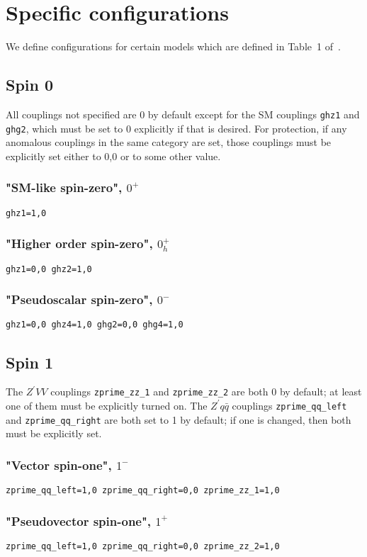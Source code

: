 \documentclass[aps,superscriptaddress,nofootinbib]{revtex4}
\begin{document}
\section{Specific configurations}
We define configurations for certain models which are defined in Table~1 of~\cite{Bolognesi:2012}.
\subsection{Spin 0}
All couplings not specified are 0 by default except for the SM couplings \verb|ghz1| and \verb|ghg2|, which must be set to 0 explicitly if that is desired.  For protection, if any anomalous couplings in the same category are set, those couplings must be explicitly set either to 0,0 or to some other value.
\subsubsection{"SM-like spin-zero", \texorpdfstring{$0^+$}{0+}}
\verb|ghz1=1,0|
\subsubsection{"Higher order spin-zero", \texorpdfstring{$0_h^+$}{0h+}}
\verb|ghz1=0,0 ghz2=1,0|
\subsubsection{"Pseudoscalar spin-zero", \texorpdfstring{$0^-$}{0-}}
\verb|ghz1=0,0 ghz4=1,0 ghg2=0,0 ghg4=1,0|
\subsection{Spin 1}
The $Z^\prime VV$ couplings \verb|zprime_zz_1| and \verb|zprime_zz_2| are both 0 by default; at least one of them must be explicitly turned on.  The $Z^{\prime}q\bar{q}$ couplings \verb|zprime_qq_left| and \verb|zprime_qq_right| are both set to 1 by default; if one is changed, then both must be explicitly set.
\subsubsection{"Vector spin-one", \texorpdfstring{$1^-$}{1-}}
\verb|zprime_qq_left=1,0 zprime_qq_right=0,0 zprime_zz_1=1,0|
\subsubsection{"Pseudovector spin-one", \texorpdfstring{$1^+$}{1+}}
\verb|zprime_qq_left=1,0 zprime_qq_right=0,0 zprime_zz_2=1,0|
\end{document}
